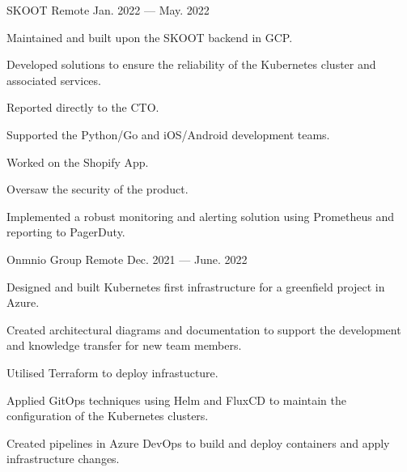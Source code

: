 

\begin{cventries}

    {SKOOT}
    {Remote}
    {Jan. 2022 — May. 2022}
    {
        \begin{cvitems}
        \item{Maintained and built upon the SKOOT backend in GCP.}
        \item{Developed solutions to ensure the reliability of the Kubernetes cluster and associated services.}
        \item{Reported directly to the CTO.}
        \item{Supported the Python/Go and iOS/Android development teams.}
	\item{Worked on the Shopify App.}
        \item{Oversaw the security of the product.}
	\item{Implemented a robust monitoring and alerting solution using Prometheus and reporting to PagerDuty.}
        \end{cvitems}
    }

    {Onmnio Group}
    {Remote}
    {Dec. 2021 — June. 2022}
    {
        \begin{cvitems}
        \item{Designed and built Kubernetes first infrastructure for a greenfield project in Azure.}
        \item{Created architectural diagrams and documentation to support the development and knowledge transfer for new team members.}
        \item{Utilised Terraform to deploy infrastucture.}
        \item{Applied GitOps techniques using Helm and FluxCD to maintain the configuration of the Kubernetes clusters.}
        \item{Created pipelines in Azure DevOps to build and deploy containers and apply infrastructure changes.}
        \end{cvitems}
    }


\end{cventries}
